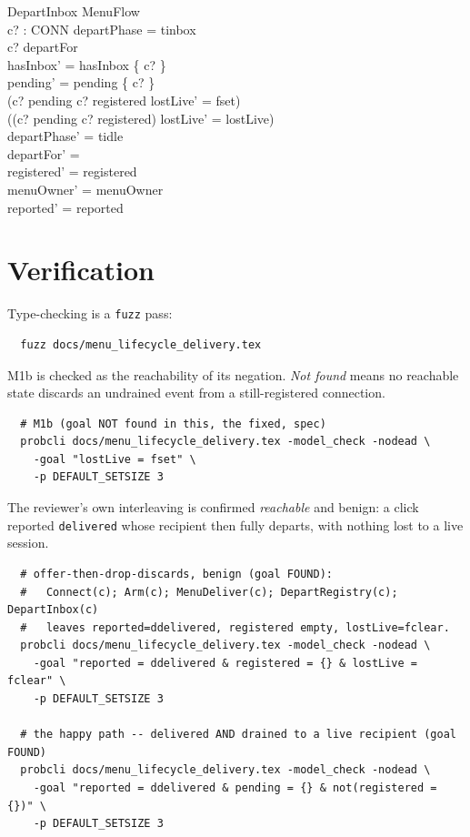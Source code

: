 \documentclass[a4paper,10pt,fleqn]{article}
\begin{document}
\begin{schema}{DepartInbox}
  \Delta MenuFlow \\
  c? : CONN
\where
  departPhase = tinbox \\
  c? \in departFor \\
  hasInbox' = hasInbox \setminus \{ c? \} \\
  pending' = pending \setminus \{ c? \} \\
  (c? \in pending \land c? \in registered \implies lostLive' = fset) \\
  (\lnot (c? \in pending \land c? \in registered) \implies lostLive' = lostLive) \\
  departPhase' = tidle \\
  departFor' = \emptyset \\
  registered' = registered \\
  menuOwner' = menuOwner \\
  reported' = reported
\end{schema}

\section{Verification}
\label{sec:verify}

Type-checking is a \texttt{fuzz} pass:
\begin{verbatim}
  fuzz docs/menu_lifecycle_delivery.tex
\end{verbatim}

M1b is checked as the reachability of its negation. \emph{Not found} means no
reachable state discards an undrained event from a still-registered connection.

\begin{verbatim}
  # M1b (goal NOT found in this, the fixed, spec)
  probcli docs/menu_lifecycle_delivery.tex -model_check -nodead \
    -goal "lostLive = fset" \
    -p DEFAULT_SETSIZE 3
\end{verbatim}

The reviewer's own interleaving is confirmed \emph{reachable} and benign: a
click reported \texttt{delivered} whose recipient then fully departs, with
nothing lost to a live session.

\begin{verbatim}
  # offer-then-drop-discards, benign (goal FOUND):
  #   Connect(c); Arm(c); MenuDeliver(c); DepartRegistry(c); DepartInbox(c)
  #   leaves reported=ddelivered, registered empty, lostLive=fclear.
  probcli docs/menu_lifecycle_delivery.tex -model_check -nodead \
    -goal "reported = ddelivered & registered = {} & lostLive = fclear" \
    -p DEFAULT_SETSIZE 3

  # the happy path -- delivered AND drained to a live recipient (goal FOUND)
  probcli docs/menu_lifecycle_delivery.tex -model_check -nodead \
    -goal "reported = ddelivered & pending = {} & not(registered = {})" \
    -p DEFAULT_SETSIZE 3
\end{verbatim}
\end{document}
